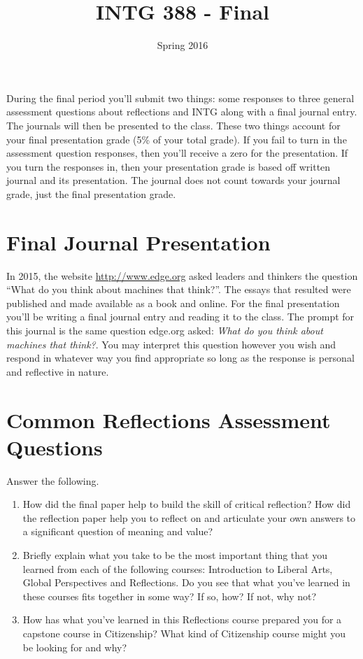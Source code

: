 \documentclass[]{tufte-handout}
\title{INTG 388 - Final }
\author{}
\date{ Spring 2016 }
\begin{document}
\maketitle

During the final period you'll submit two things: some responses to three general assessment questions about reflections and INTG along with a final journal entry. The journals will then be presented to the class. These two things account for your final presentation grade (5\% of your total grade). If you fail to turn in the assessment question responses, then you'll receive a zero for the presentation. If you turn the responses in, then your presentation grade is based off written journal and its presentation.  The journal does not count towards your journal grade, just the final presentation grade.  

\section*{Final Journal Presentation}

In 2015, the website \url{http://www.edge.org} asked leaders and thinkers the question ``What do you think about machines that think?''. The essays that resulted were published and made available as a book and online. For the final presentation you'll be writing a final journal entry and reading it to the class. The prompt for this journal is the same question edge.org asked: \textit{What do you think about machines that think?}.  You may interpret this question however you wish and respond in whatever way you find appropriate so long as the response is personal and reflective in nature. 


\section*{Common Reflections Assessment Questions}

Answer the following.  
\begin{enumerate}
\item How did the final paper help to build the skill of critical reflection? How did the reflection paper help you to reflect on and articulate your own answers to a significant question of meaning and value?

\item Briefly explain what you take to be the most important thing that you learned from each of the following courses: Introduction to Liberal Arts, Global Perspectives and Reflections. Do you see that what you've learned in these courses fits together in some way? If so, how? If not, why not?

\item How has what you've learned in this Reflections course prepared you for a capstone course in Citizenship? What kind of Citizenship course might you be looking for and why?
\end{enumerate}
\end{document}

